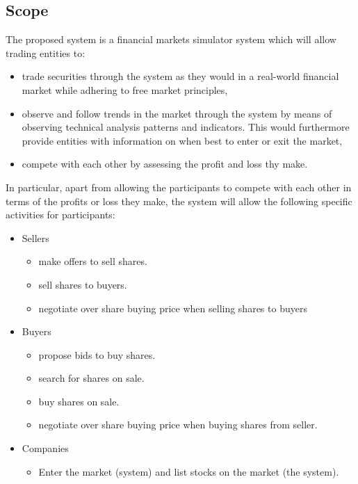 \documentclass[12pt]{article}
\begin{document}
		\subsection{Scope}
		The proposed system is a financial markets simulator system which will allow trading entities to:
		\begin{itemize}
		\item trade securities through the system as they would in a real-world financial market while adhering to free market principles,
		\item observe and follow trends in the market through the system by means of observing technical analysis patterns and indicators. This would furthermore provide entities with information on when best to enter or exit the market,
		\item compete with each other by assessing the profit and loss thy make.
		\end{itemize}
		
		In particular, apart from allowing the participants to compete with each other in terms of the profits or loss they make, the system will allow the following specific activities for participants:
		
		\begin{itemize}
		\item Sellers
			\begin{itemize}
			\item make offers to sell shares.
			\item sell shares to buyers.
			\item negotiate over share buying price when selling shares to buyers
			\end{itemize}
		\item Buyers
			\begin{itemize}
			\item propose bids to buy shares.
			\item search for shares on sale.
			\item buy shares on sale.
			\item negotiate over share buying price when buying shares from seller.
			\end{itemize}
		\item Companies
			\begin{itemize}
			\item Enter the market (system) and list stocks on the market (the system).
			\end{itemize}
		
		\end{itemize}
\end{document}
